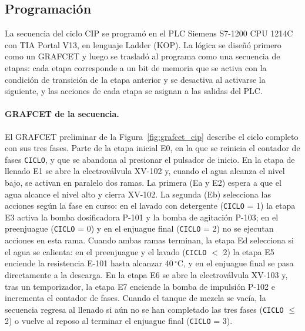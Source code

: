 \subsection{Programación}\label{sec:montaje_programacion}

La secuencia del ciclo CIP se programó en el PLC Siemens S7-1200 CPU 1214C con TIA Portal V13, en lenguaje Ladder (KOP). La lógica se diseñó primero como un GRAFCET y luego se trasladó al programa como una secuencia de etapas: cada etapa corresponde a un bit de memoria que se activa con la condición de transición de la etapa anterior y se desactiva al activarse la siguiente, y las acciones de cada etapa se asignan a las salidas del PLC.

\paragraph{GRAFCET de la secuencia.} El GRAFCET preliminar de la Figura~\ref{fig:grafcet_cip} describe el ciclo completo con sus tres fases. Parte de la etapa inicial E0, en la que se reinicia el contador de fases \texttt{CICLO}, y que se abandona al presionar el pulsador de inicio. En la etapa de llenado E1 se abre la electroválvula XV-102 y, cuando el agua alcanza el nivel bajo, se activan en paralelo dos ramas. La primera (Ea y E2) espera a que el agua alcance el nivel alto y cierra XV-102. La segunda (Eb) selecciona las acciones según la fase en curso: en el lavado con detergente (\texttt{CICLO} = 1) la etapa E3 activa la bomba dosificadora P-101 y la bomba de agitación P-103; en el preenjuague (\texttt{CICLO} = 0) y en el enjuague final (\texttt{CICLO} = 2) no se ejecutan acciones en esta rama. Cuando ambas ramas terminan, la etapa Ed selecciona si el agua se calienta: en el preenjuague y el lavado (\texttt{CICLO} $<$ 2) la etapa E5 enciende la resistencia E-101 hasta alcanzar 40\,$^{\circ}$C, y en el enjuague final se pasa directamente a la descarga. En la etapa E6 se abre la electroválvula XV-103 y, tras un temporizador, la etapa E7 enciende la bomba de impulsión P-102 e incrementa el contador de fases. Cuando el tanque de mezcla se vacía, la secuencia regresa al llenado si aún no se han completado las tres fases (\texttt{CICLO} $\leq$ 2) o vuelve al reposo al terminar el enjuague final (\texttt{CICLO} = 3).


